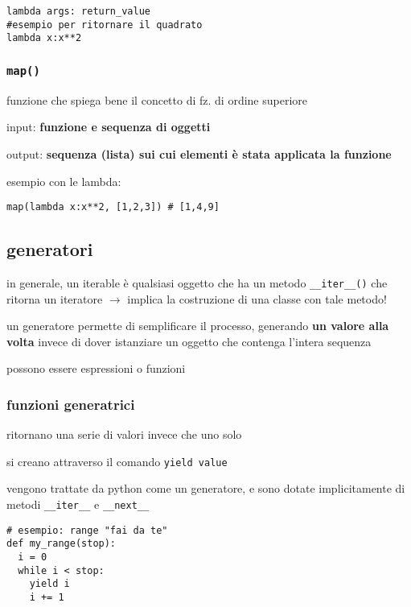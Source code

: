 \begin{verbatim}
lambda args: return_value
#esempio per ritornare il quadrato
lambda x:x**2
\end{verbatim}

\subsubsection{\texttt{map()}}

funzione che spiega bene il concetto di fz. di ordine superiore

input: \textbf{funzione e sequenza di oggetti}

output: \textbf{sequenza (lista) sui cui elementi \`e stata applicata la funzione}

esempio con le lambda:

\begin{verbatim}
map(lambda x:x**2, [1,2,3]) # [1,4,9]
\end{verbatim}

\subsection{generatori}

in generale, un iterable \`e qualsiasi oggetto che ha un metodo \texttt{__iter__()} che ritorna un iteratore $\rightarrow$ implica la costruzione di una classe con tale metodo!

un generatore permette di semplificare il processo, generando \textbf{un valore alla volta} invece di dover istanziare un oggetto che contenga l'intera sequenza

possono essere espressioni o funzioni

\subsubsection{funzioni generatrici}

ritornano una serie di valori invece che uno solo

si creano attraverso il comando \texttt{yield value}

vengono trattate da python come un generatore, e sono dotate implicitamente di metodi \texttt{__iter__} e \texttt{__next__}

\begin{verbatim}
# esempio: range "fai da te"
def my_range(stop):
  i = 0
  while i < stop:
    yield i
    i += 1
\end{verbatim}

